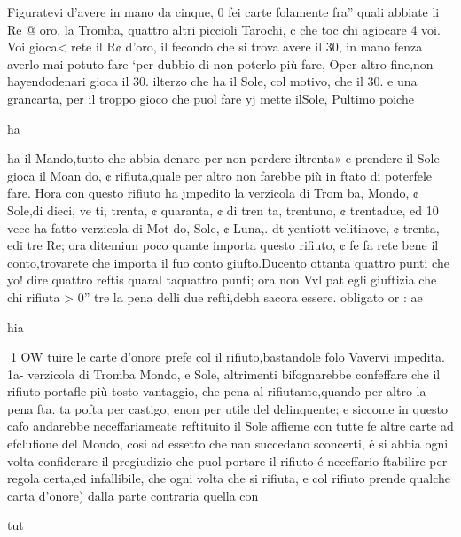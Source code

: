 \documentclass[12pt,a6paper]{article}
\begin{document}
 Figuratevi d’avere in mano
da cinque, 0 fei carte folamente fra” quali abbiate li Re @
oro, la Tromba, quattro altri piccioli Tarochi, ¢ che toc
chi agiocare 4 voi. Voi gioca<
rete il R¢ d’oro, il fecondo che
si trova avere il 30, in mano
fenza averlo mai potuto fare
‘per dubbio di non poterlo più
fare, Oper altro fine,non hayendodenari gioca il 30. ilterzo
che ha il Sole, col motivo, che
il 30. e una grancarta, per il
troppo gioco che puol fare yj
mette ilSole, Pultimo poiche

ha

 

 

 

 
 

 

 

 

ha il Mando,tutto che abbia denaro per non perdere iltrenta»
e prendere il Sole gioca il Moan
do, ¢ rifiuta,quale per altro non
farebbe più in ftato di poterfele
fare. Hora con questo rifiuto ha
jmpedito la verzicola di Trom
ba, Mondo, ¢ Sole,di dieci, ve
ti, trenta, ¢ quaranta, ¢ di tren
ta, trentuno, ¢ trentadue, ed 10
vece ha fatto verzicola di Mot
do, Sole, ¢ Luna,. dt yentiott
velitinove, ¢ trenta, edi tre
Re; ora ditemiun poco quante
importa questo rifiuto, ¢ fe fa
rete bene il conto,trovarete che
importa il fuo conto giufto.Ducento ottanta quattro punti che
yo! dire quattro reftis quaral
taquattro punti; ora non Vvl pat
egli giuftizia che chi rifiuta > 0”
tre la pena delli due refti,debh
sacora essere. obligato or :
ae

hia

 
1 OW
tuire le carte d’onore prefe col
il rifiuto,bastandole folo Vavervi impedita. 1a- verzicola di
Tromba Mondo, e Sole, altrimenti bifognarebbe confeffare
che il rifiuto portafle più tosto
vantaggio, che pena al rifiutante,quando per altro la pena fta.
ta pofta per castigo, enon per
utile del delinquente; e siccome
in questo cafo andarebbe neceffariameate reftituito il Sole affieme con tutte fe altre carte ad
efclufione del Mondo, cosi ad
essetto che nan succedano sconcerti, é si abbia ogni volta
confiderare il pregiudizio che
puol portare il rifiuto é neceffario ftabilire per regola certa,ed infallibile, che ogni volta
che si rifiuta, e col rifiuto
prende qualche carta d’onore)
dalla parte contraria quella con

tut
 

 

 
 
\end{document}
